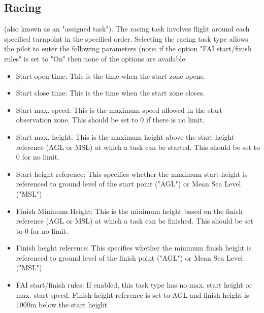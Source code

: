 \subsection*{Racing}
(also known as an "assigned task").  The racing task involves flight 
around each specified turnpoint in the specified order.  Selecting the racing task 
type allows the pilot to enter the following parameters (note: if the option 
"FAI start/finish rules" is set to "On" then none of the options are available: 
  \begin{itemize}
  \item Start open time: This is the time when the start zone opens.
  \item Start close time: This is the time when the start zone closes.
  \item Start max. speed: This is the maximum speed allowed in the start observation 
    zone.  This should be set to 0 if there is no limit.
  \item Start max. height: This is the maximum height above the start height 
    reference (AGL or MSL) at which a task can be started.  This  should be set to 
    0 for no limit.
  \item Start height reference: This specifies whether the maximum start height is 
    referenced to ground level of the start point ("AGL") or Mean Sea Level ("MSL")
  \item Finish Minimum Height: This is the minimum height based on the finish 
    reference (AGL or MSL) at which a task can be finished.  This should be set to 
    0 for no limit.
  \item Finish height reference: This specifies whether the minimum finish height 
    is referenced to ground level of the finish point ("AGL") or Mean Sea Level ("MSL")
  \item FAI start/finish rules: If enabled, this task type has no max. start height 
    or max. start speed.  Finish height reference is set to AGL and finish height 
    is 1000m below the start height 
  \end{itemize}
